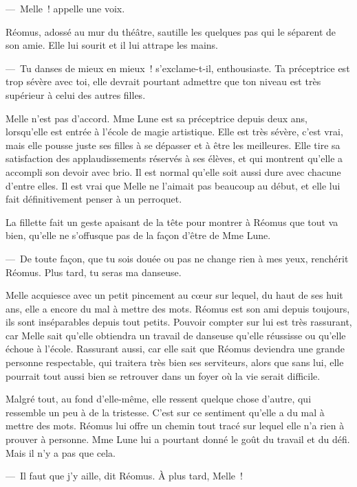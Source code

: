 ---~Melle~! appelle une voix.

Réomus, adossé au mur du théâtre, sautille les quelques pas qui le séparent de son amie. Elle lui sourit et il lui attrape les mains.

---~Tu danses de mieux en mieux~! s'exclame-t-il, enthousiaste. Ta préceptrice est trop sévère avec toi, elle devrait pourtant admettre que ton niveau est très supérieur à celui des autres filles.

Melle n'est pas d'accord. Mme Lune est sa préceptrice depuis deux ans, lorsqu'elle est entrée à l'école de magie artistique. Elle est très sévère, c'est vrai, mais elle pousse juste ses filles à se dépasser et à être les meilleures. Elle tire sa satisfaction des applaudissements réservés à ses élèves, et qui montrent qu'elle a accompli son devoir avec brio. Il est normal qu'elle soit aussi dure avec chacune d'entre elles. Il est vrai que Melle ne l'aimait pas beaucoup au début, et elle lui fait définitivement penser à un perroquet.

La fillette fait un geste apaisant de la tête pour montrer à Réomus que tout va bien, qu'elle ne s'offusque pas de la façon d'être de Mme Lune.

---~De toute façon, que tu sois douée ou pas ne change rien à mes yeux, renchérit Réomus. Plus tard, tu seras ma danseuse.

Melle acquiesce avec un petit pincement au cœur sur lequel, du haut de ses huit ans, elle a encore du mal à mettre des mots. Réomus est son ami depuis toujours, ils sont inséparables depuis tout petits. Pouvoir compter sur lui est très rassurant, car Melle sait qu'elle obtiendra un travail de danseuse qu'elle réussisse ou qu'elle échoue à l'école. Rassurant aussi, car elle sait que Réomus deviendra une grande personne respectable, qui traitera très bien ses serviteurs, alors que sans lui, elle pourrait tout aussi bien se retrouver dans un foyer où la vie serait difficile.

Malgré tout, au fond d'elle-même, elle ressent quelque chose d'autre, qui ressemble un peu à de la tristesse. C'est sur ce sentiment qu'elle a du mal à mettre des mots. Réomus lui offre un chemin tout tracé sur lequel elle n'a rien à prouver à personne. Mme Lune lui a pourtant donné le goût du travail et du défi. Mais il n'y a pas que cela.

---~Il faut que j'y aille, dit Réomus. À plus tard, Melle~!

